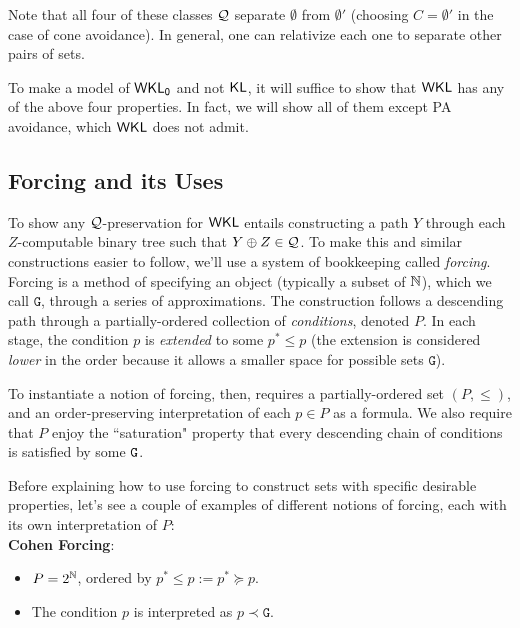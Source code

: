 \documentclass{amsart}
\begin{document}
	Note that all four of these classes $\mathcal{Q}$ separate $\emptyset$ from $\emptyset'$ (choosing $C=\emptyset'$ in the case of cone avoidance). In general, one can relativize each one to separate other pairs of sets.
	
	To make a model of $\operatorname{\sf{WKL_0}}$ and not $\operatorname{\sf{KL}}$, it will suffice to show that $\sf{WKL}$ has any of the above four properties. In fact, we will show all of them except PA avoidance, which $\sf{WKL}$ does not admit.
	
	
	\subsection{Forcing and its Uses}
	
	To show any $\mathcal{Q}$-preservation for $\sf{WKL}$ entails constructing a path $Y$ through each $Z$-computable binary tree such that $Y\oplus Z \in \mathcal{Q}$. To make this and similar constructions easier to follow, we'll use a system of bookkeeping called \textit{forcing}.\\
	
	Forcing is a method of specifying an object (typically a subset of $\mathbb{N}$), which we call $\mathtt{G}$, through a series of approximations. The construction follows a descending path through a partially-ordered collection of \textit{conditions}, denoted $P$. In each stage, the condition $p$ is \textit{extended} to some $p^*\leq p$ (the extension is considered \textit{lower} in the order because it allows a smaller space for possible sets $\mathtt{G}$). 
	
	To instantiate a notion of forcing, then, requires a partially-ordered set $(P,\leq)$, and an order-preserving interpretation of each $p\in P$ as a formula. We also require that $P$ enjoy the ``saturation" property that every descending chain of conditions is satisfied by some $\tt{G}$. 
	
	Before explaining how to use forcing to construct sets with specific desirable properties, let's see a couple of examples of different notions of forcing, each with its own interpretation of $P$:\\
	
	\textbf{Cohen Forcing}: 
	\begin{itemize}
		\item $P = 2^{\mathbb{N}}$, ordered by $p^*\leq p := p^*\succeq p$.
		\item The condition $p$ is interpreted as $p\prec \mathtt{G}$.
	\end{itemize}
	
\end{document}
